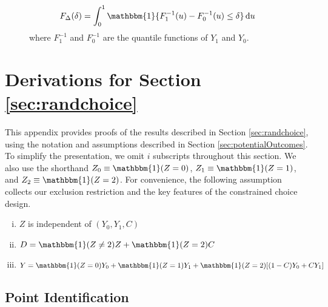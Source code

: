 \begin{figure}
    \[F_\Delta(\delta) = \int_0^1 \mathbbm{1}\{ F_1^{-1}(u) - F_0^{-1}(u)\leq \delta\}\,\mathrm{d}u\]
where $F_1^{-1}$ and $F_0^{-1}$ are the quantile functions of $Y_1$ and $Y_0$.
\end{figure}



\newpage



\section{ Derivations for Section \ref{sec:randchoice}}
\label{append:randchoice}


This appendix provides proofs of the results described in Section \ref{sec:randchoice}, using the notation and assumptions described in Section \ref{sec:potentialOutcomes}. 
To simplify the presentation, we omit $i$ subscripts throughout this section.
We also use the shorthand $Z_0 \equiv \mathbbm{1}(Z=0)$, $Z_1 \equiv \mathbbm{1}(Z=1)$, and $Z_2 \equiv\mathbbm{1}(Z=2)$.
For convenience, the following assumption collects our exclusion restriction and the key features of the constrained choice design.

\begin{assumption}\mbox{}
\label{assump:randchoice}
   \begin{enumerate}[(i)]
   \item $Z$ is independent of $(Y_{0}, Y_{1}, C)$
   \item $D = \mathbbm{1}(Z \neq 2)Z + \mathbbm{1}(Z = 2)C$
   \item $Y = \mathbbm{1}(Z = 0) Y_{0} + \mathbbm{1}(Z = 1) Y_{1} + \mathbbm{1}(Z = 2) [ (1 - C) Y_{0} + C Y_{1}]$
   \end{enumerate}
\end{assumption}


\subsection{Point Identification}

